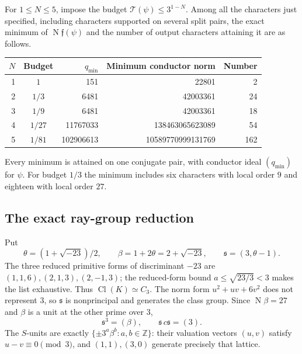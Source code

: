 \begin{theorem}
\label{thm:source_twist_minimum}
For $1\le N\le5$, impose the budget
$\mathcal T(\psi)\le3^{1-N}$.  Among all the characters just specified,
including characters supported on several split pairs, the exact minimum
of $\operatorname N\mathfrak f(\psi)$ and the number of output
characters attaining it are as follows.
\begin{center}
\begin{tabular}{rcrrr}
\hline
$N$ & Budget & $q_{\min}$ & Minimum conductor norm & Number\\
\hline
1 & $1$    & 151       & 22801             & 2\\
2 & $1/3$  & 6481      & 42003361          & 24\\
3 & $1/9$  & 6481      & 42003361          & 18\\
4 & $1/27$ & 11767033  & 138463065623089   & 54\\
5 & $1/81$ & 102906613 & 10589770999131769 & 162\\
\hline
\end{tabular}
\end{center}
Every minimum is attained on one conjugate pair, with conductor ideal
$(q_{\min})$ for $\psi$.  For budget $1/3$ the minimum includes six
characters with local order $9$ and eighteen with local order $27$.
\end{theorem}

\subsection{The exact ray-group reduction}

Put
\[
 \theta=(1+\sqrt{-23})/2,\qquad
 \beta=1+2\theta=2+\sqrt{-23},\qquad
 \mathfrak s=(3,\theta-1).
\]
The three reduced primitive forms of discriminant $-23$ are
$(1,1,6),(2,1,3),(2,-1,3)$; the reduced-form bound
$a\le\sqrt{23/3}<3$ makes the list exhaustive.  Thus
$\operatorname{Cl}(K)\simeq C_3$.
The norm form $u^2+uv+6v^2$ does not represent $3$, so
$\mathfrak s$ is nonprincipal and generates the class group.
Since $\operatorname N\beta=27$ and $\beta$ is a unit at the other
prime over $3$,
\begin{equation}\label{eq:source_twist_class_relations}
       \mathfrak s^3=(\beta),\qquad
       \mathfrak s\,c\mathfrak s=(3).
\end{equation}
The $S$-units are exactly $\{\pm3^a\beta^b:a,b\in\mathbb Z\}$:
their valuation vectors $(u,v)$ satisfy $u-v\equiv0\pmod3$, and
$(1,1),(3,0)$ generate precisely that lattice.

